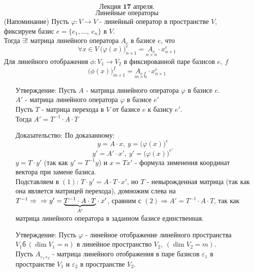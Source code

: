 \documentclass[12pt, letterpaper, twoside]{article}
\begin{document}
        \[\textbf{Лекция 17 апреля.}\]
        \[\text{Линейные операторы}\]
        (Напоминание) Пусть $\varphi: V\longrightarrow V$ - линейный оператор в пространстве $V$, фиксируем базис $e = \{e_1,\dots,\ e_n\}$ в $V$.\\
        Тогда $\exists!$ матрица линейного оператора $A_e$ в базисе $e$, что
        \[\forall x\in V\ \big(\varphi(x)\big)^e_{n\times 1} = \underset{n\times n}{A_e}\cdot x^e_{n\times 1}\]
        Для линейного отображения $\phi: V_1\longrightarrow V_2$ в фиксированной паре базисов $e,\ f$
        \[\big( \phi(x) \big)^f_{m\times 1} = \underset{m\times n}{A_{e\, f}}\cdot x^e_{n\times 1}\]
        \begin{enumerate}
            \item[Утверждение:]Пусть $A$ - матрица линейного оператора $\varphi$ в базисе $e$.\\
            $A'$ - матрица линейного оператора $\varphi$ в базисе $e'$\\
            Пусть $T$ - матрица перехода в $V$ от базисе $e$ к базису $e'$.\\
            Тогда $A' = T^{-1}\cdot A\cdot T$
            \item[Доказательство:] По доказанному: 
            \begin{equation}
                y = A\cdot x,\ y = \big(\varphi(x)\big)^e
            \end{equation}
            \begin{equation}
                y' = A'\cdot x',\ y' = \big( \varphi(x) \big)^{e'}
            \end{equation}
            $y = T\cdot y'$ (так как $y' = T^{-1}y$) и $x = Tx'$ - формула зименения координат вектора при замене базиса.\\
            Подставляем в $(1)$: $T\cdot y' = A\cdot T\cdot x'$, но $T$ - невырожденная матрица (так как она является матрицей перехода), домножим слева на $T^{-1}\Rightarrow\\
            \Rightarrow y' = \underset{A'}{\underbrace{T^{-1}\cdot A\cdot T}}\cdot x'$, сравним с $(2)\Rightarrow A' = T^{-1}\cdot A\cdot T$, так как матрица линейного оператора в заданном базисе единственная.
            \item[Утверждение:] Пусть $\varphi$ - линейное отображение линейного пространства $V_1б\ (\dim V_1 = n)$ в линейное пространство $V_2,\ (\dim V_2 = m)$.\\
            Пусть $A_{\varepsilon_1\, \varepsilon_2}$ - матрица линейного отображения в паре базисов $\varepsilon_1$ в пространстве $V_1$ и $\varepsilon_2$ в пространстве $V_2$.\\

\end{enumerate}
\end{document}
